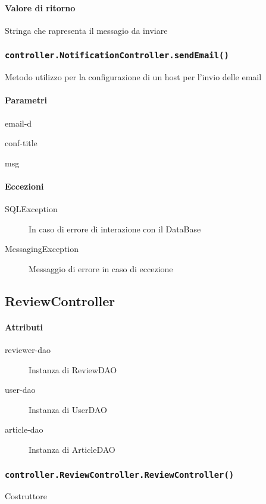 \paragraph{Valore di ritorno}
Stringa che rapresenta il messagio da inviare

\subsubsection{\texttt{controller.NotificationController.sendEmail()}}
Metodo utilizzo per la configurazione di un host per l'invio delle email
\paragraph{Parametri}
\begin{description}
\item email-d
\item conf-title
\item msg
\end{description}
\paragraph{Eccezioni}
\begin{description}
\item[SQLException] In caso di errore di interazione con il DataBase
\item[MessagingException] Messaggio di errore in caso di eccezione
\end{description}


\subsection{ReviewController}
\paragraph{Attributi}
\begin{description}
\item[reviewer-dao] Instanza di ReviewDAO
\item[user-dao] Instanza di UserDAO
\item[article-dao] Instanza di ArticleDAO
\end{description}

\subsubsection{\texttt{controller.ReviewController.ReviewController()}}
Costruttore
